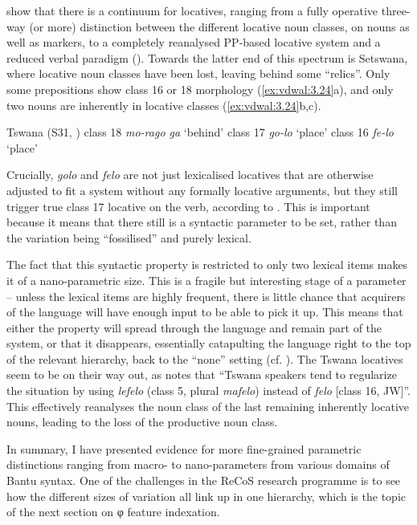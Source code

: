 \documentclass[output=paper]{langsci/langscibook}
\begin{document}
\citet{RiedelMarten2012} show that there is a continuum for  locatives,
ranging from a fully operative three-way (or more) distinction between the
different locative noun classes, on nouns as well as  markers, to a
completely reanalysed PP-based locative system and a reduced verbal 
paradigm (\citealt{DemuthMmusi1997,Creissels2011}). Towards the latter end of
this spectrum is Setswana, where locative noun classes have been lost, leaving
behind some “relics”. Only some prepositions show class 16 or 18 morphology
(\ref{ex:vdwal:3.24}a), and only two nouns are inherently in locative classes
(\ref{ex:vdwal:3.24}b,c).

\ea\label{ex:vdwal:3.24} Tswana (S31, \citealt{Creissels2011})
    \ea class 18 \emph{mo-rago ga} ‘behind’
    \ex class 17 \emph{go-lo} ‘place’
    \ex class 16 \emph{fe-lo} ‘place’
    \z
\z

Crucially, \emph{golo} and \emph{felo} are not just lexicalised locatives that
are otherwise adjusted to fit a system without any formally locative arguments,
but they still trigger true class 17 locative  on the verb, according
to \citet{Creissels2011}. This is important because it means that there still
is a syntactic parameter to be set, rather than the variation being
“fossilised” and purely lexical.

The fact that this syntactic property is restricted to only two lexical items
makes it of a nano-parametric size. This is a fragile but interesting stage of
a parameter – unless the lexical items are highly frequent, there is little
chance that acquirers of the language will have enough input to be able to pick
it up. This means that either the property will spread through the language and
remain part of the system, or that it disappears, essentially catapulting the
language right to the top of the relevant hierarchy, back to the \enquote{none} setting
(cf. \citealt{BibRob2016}). The Tswana locatives seem to be on their
way out, as \citet[36]{Creissels2011} notes that “Tswana speakers tend to
regularize the situation by using \emph{lefelo} (class 5, plural \emph{mafelo})
instead of \emph{felo} [class 16, JW]”. This effectively reanalyses the noun
class of the last remaining inherently locative nouns, leading to the loss of
the productive noun class.

In summary, I have presented evidence for more fine-grained parametric
distinctions ranging from macro- to nano-parameters from various domains of
Ban\-tu syntax. One of the challenges in the ReCoS research programme is to see
how the different sizes of variation all link up in one hierarchy, which is the
topic of the next section on φ feature indexation.
\end{document}
